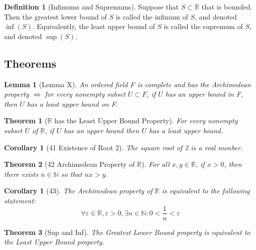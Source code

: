 \documentclass[12pt]{article}
\newtheorem*{thm*}{Theorem}
\newtheorem{lem}[thm]{Lemma}  %
\newtheorem{cor}[thm]{Corollary}
\theoremstyle{definition}
\newtheorem{defn}[thm]{Definition}
\theoremstyle{remark}
\numberwithin{equation}{section}
\newcommand\R{\mathbb R}    %
\newcommand\N{\mathbb N}    %
\begin{document}
\begin{defn}[Infimums and Supremums]
        Suppose that $S \subset \R$ that is bounded. Then the greatest lower bound of $S$ is called the infimum of $S$, and denoted $\inf(S)$. Equivalently, the least upper bound of $S$ is called the supremum of $S$, and denoted $\sup(S)$.
\end{defn}




\subsection{Theorems}


\begin{lem}[Lemma X]
        An ordered field F is complete and has the Archimedean property $\iff$ for every nonempty subset $U \subset F$, if $U$ has an upper bound in F, then $U$ has a least upper bound on F.
\end{lem}



\begin{thm*}[$\R$ has the Least Upper Bound Property]
        For every nonempty subset $U$ of $\R$, if $U$ has an upper bound then $U$ has a least upper bound.
\end{thm*}



\begin{cor}[41 Existence of Root 2]
        The square root of 2 is a real number.
\end{cor}


\begin{thm*}[42 Archimedean Property of $\R$]
        For all $x,y \in \R$, if $x > 0$, then there exists $n \in \N$ so that $nx >y$.
\end{thm*}



\begin{cor}[43]
        The Archimedean property of $\R$ is equivalent to the following statement:$$\forall \varepsilon \in \R, \varepsilon > 0, \exists n \in \N: 0 < \frac{1}{n} < \varepsilon$$
\end{cor}



\begin{thm*}[Sup and Inf]
        The Greatest Lower Bound property is equivalent to the Least Upper Bound property.
\end{thm*}



\clearpage
\end{document}
